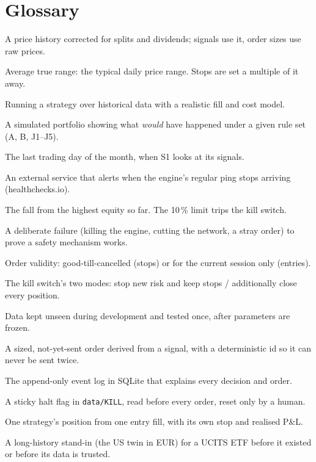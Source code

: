 \documentclass[11pt,a4paper]{article}
\newcommand\Section[1]{\Needspace{14\baselineskip}\section{#1}}
\newcommand\code[1]{\texttt{#1}}
\begin{document}
\Section{Glossary}
\begin{description}[style=nextline,leftmargin=1.4em,font=\sffamily\bfseries\color{accent},itemsep=3pt]
\small
  \item[Adjusted price] A price history corrected for splits and dividends; signals use it, order sizes use raw prices.
  \item[ATR] Average true range: the typical daily price range. Stops are set a multiple of it away.
  \item[Backtest] Running a strategy over historical data with a realistic fill and cost model.
  \item[Book (counterfactual)] A simulated portfolio showing what \emph{would} have happened under a given rule set (A, B, J1--J5).
  \item[Check day] The last trading day of the month, when S1 looks at its signals.
  \item[Dead-man's switch] An external service that alerts when the engine's regular ping stops arriving (healthchecks.io).
  \item[Drawdown] The fall from the highest equity so far. The 10\,\% limit trips the kill switch.
  \item[Drill] A deliberate failure (killing the engine, cutting the network, a stray order) to prove a safety mechanism works.
  \item[GTC / DAY] Order validity: good-till-cancelled (stops) or for the current session only (entries).
  \item[HALT / FLATTEN] The kill switch's two modes: stop new risk and keep stops / additionally close every position.
  \item[Holdout] Data kept unseen during development and tested once, after parameters are frozen.
  \item[Intent] A sized, not-yet-sent order derived from a signal, with a deterministic id so it can never be sent twice.
  \item[Journal] The append-only event log in SQLite that explains every decision and order.
  \item[Kill switch] A sticky halt flag in \code{data/KILL}, read before every order, reset only by a human.
  \item[Lot] One strategy's position from one entry fill, with its own stop and realised P\&L.
  \item[Proxy] A long-history stand-in (the US twin in EUR) for a UCITS ETF before it existed or before its data is trusted.

\end{description}
\end{document}
